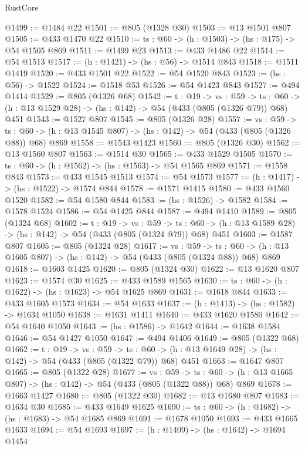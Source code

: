 \begin{lexlean}{RustCore}
\begin{coremodule}
@1499 := @1484 @22
@1501 := @805 (@1328 @30)
@1503 := @13 @1501 @807
@1505 := @433 @1470 @22
@1510 := {ts : @60} -> (h : @1503) -> (hs : @175) -> @54 @1505 @869
@1511 := @1499 @23
@1513 := @433 @1486 @22
@1514 := @54 @1513
@1517 := (h : @1421) -> (hs : @56) -> @1514 @843
@1518 := @1511 @1419
@1520 := @433 @1501 @22
@1522 := @54 @1520 @843
@1523 := (hs : @56) -> @1522
@1524 := @1518 @53
@1526 := @54 @1423 @843
@1527 := @494 @1414
@1529 := @805 (@1326 @68)
@1542 := {t : @19} ->
  {vs : @59} ->
  {ts : @60} -> (h : @13 @1529 @28) -> (hs : @142) -> @54 (@433 (@805 (@1326 @79)) @68) @451
@1543 := @1527 @807
@1545 := @805 (@1326 @28)
@1557 := {vs : @59} ->
  {ts : @60} -> (h : @13 @1545 @807) -> (hs : @142) -> @54 (@433 (@805 (@1326 @88)) @68) @869
@1558 := @1543 @1423
@1560 := @805 (@1326 @30)
@1562 := @13 @1560 @807
@1563 := @1514 @30
@1565 := @433 @1529 @1505
@1570 := {ts : @60} -> (h : @1562) -> (hs : @1563) -> @54 @1565 @869
@1571 := @1558 @843
@1573 := @433 @1545 @1513
@1574 := @54 @1573
@1577 := (h : @1417) -> (hs : @1522) -> @1574 @844
@1578 := @1571 @1415
@1580 := @433 @1560 @1520
@1582 := @54 @1580 @844
@1583 := (hs : @1526) -> @1582
@1584 := @1578 @1524
@1586 := @54 @1425 @844
@1587 := @494 @1410
@1589 := @805 (@1324 @68)
@1602 := {t : @19} ->
  {vs : @59} ->
  {ts : @60} -> (h : @13 @1589 @28) -> (hs : @142) -> @54 (@433 (@805 (@1324 @79)) @68) @451
@1603 := @1587 @807
@1605 := @805 (@1324 @28)
@1617 := {vs : @59} ->
  {ts : @60} -> (h : @13 @1605 @807) -> (hs : @142) -> @54 (@433 (@805 (@1324 @88)) @68) @869
@1618 := @1603 @1425
@1620 := @805 (@1324 @30)
@1622 := @13 @1620 @807
@1623 := @1574 @30
@1625 := @433 @1589 @1565
@1630 := {ts : @60} -> (h : @1622) -> (hs : @1623) -> @54 @1625 @869
@1631 := @1618 @844
@1633 := @433 @1605 @1573
@1634 := @54 @1633
@1637 := (h : @1413) -> (hs : @1582) -> @1634 @1050
@1638 := @1631 @1411
@1640 := @433 @1620 @1580
@1642 := @54 @1640 @1050
@1643 := (hs : @1586) -> @1642
@1644 := @1638 @1584
@1646 := @54 @1427 @1050
@1647 := @494 @1406
@1649 := @805 (@1322 @68)
@1662 := {t : @19} ->
  {vs : @59} ->
  {ts : @60} -> (h : @13 @1649 @28) -> (hs : @142) -> @54 (@433 (@805 (@1322 @79)) @68) @451
@1663 := @1647 @807
@1665 := @805 (@1322 @28)
@1677 := {vs : @59} ->
  {ts : @60} -> (h : @13 @1665 @807) -> (hs : @142) -> @54 (@433 (@805 (@1322 @88)) @68) @869
@1678 := @1663 @1427
@1680 := @805 (@1322 @30)
@1682 := @13 @1680 @807
@1683 := @1634 @30
@1685 := @433 @1649 @1625
@1690 := {ts : @60} -> (h : @1682) -> (hs : @1683) -> @54 @1685 @869
@1691 := @1678 @1050
@1693 := @433 @1665 @1633
@1694 := @54 @1693
@1697 := (h : @1409) -> (hs : @1642) -> @1694 @1454

\end{coremodule}
\end{lexlean}
